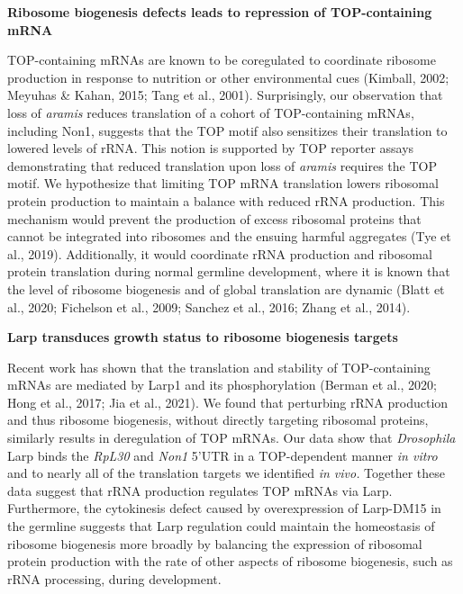 \documentclass[12pt,twoside]{reedthesis}
\begin{document}
\textbf{Ribosome biogenesis defects leads to repression of TOP-containing
mRNA}

TOP-containing mRNAs are known to be coregulated to coordinate ribosome
production in response to nutrition or other environmental cues
(Kimball, 2002; Meyuhas \& Kahan, 2015; Tang et al., 2001). Surprisingly, our observation
that loss of \emph{aramis} reduces translation of a cohort of TOP-containing
mRNAs, including Non1, suggests that the TOP motif also sensitizes their
translation to lowered levels of rRNA. This notion is supported by TOP
reporter assays demonstrating that reduced translation upon loss of
\emph{aramis} requires the TOP motif. We hypothesize that limiting TOP mRNA
translation lowers ribosomal protein production to maintain a balance
with reduced rRNA production. This mechanism would prevent the
production of excess ribosomal proteins that cannot be integrated into
ribosomes and the ensuing harmful aggregates
(Tye et al., 2019). Additionally, it would
coordinate rRNA production and ribosomal protein translation during
normal germline development, where it is known that the level of
ribosome biogenesis and of global translation are dynamic
(Blatt et al., 2020; Fichelson et al., 2009; Sanchez et al., 2016; Zhang et al., 2014).

\textbf{Larp transduces growth status to ribosome biogenesis targets}

Recent work has shown that the translation and stability of
TOP-containing mRNAs are mediated by Larp1 and its phosphorylation
(Berman et al., 2020; Hong et al., 2017; Jia et al., 2021). We found that perturbing rRNA production
and thus ribosome biogenesis, without directly targeting ribosomal
proteins, similarly results in deregulation of TOP mRNAs. Our data show
that \emph{Drosophila} Larp binds the \emph{RpL30} and \emph{Non1} 5'UTR in a
TOP-dependent manner \emph{in vitro} and to nearly all of the translation
targets we identified \emph{in vivo.} Together these data suggest that rRNA
production regulates TOP mRNAs via Larp. Furthermore, the cytokinesis
defect caused by overexpression of Larp-DM15 in the germline suggests
that Larp regulation could maintain the homeostasis of ribosome
biogenesis more broadly by balancing the expression of ribosomal protein
production with the rate of other aspects of ribosome biogenesis, such
as rRNA processing, during development.
\end{document}
